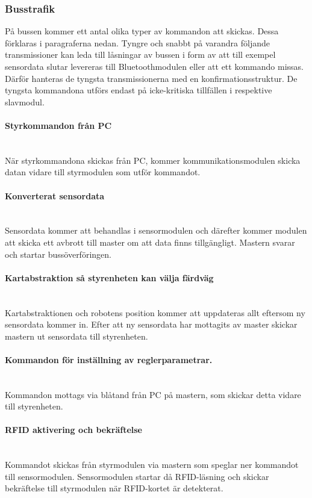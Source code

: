 \documentclass[a4paper,12pt,fleqn]{article}
\begin{document}
\subsubsection{Busstrafik}
På bussen kommer ett antal olika typer av kommandon att skickas. Dessa förklaras i paragraferna nedan. 
Tyngre och snabbt på varandra följande transmissioner kan leda till låsningar av bussen i form av att till exempel sensordata slutar levereras till Bluetoothmodulen eller att ett kommando missas. Därför hanteras de tyngsta transmissionerna med en konfirmationsstruktur.
De tyngsta kommandona utförs endast på icke-kritiska tillfällen i respektive slavmodul.

\paragraph{Styrkommandon från PC}
~\\
När styrkommandona skickas från PC, kommer kommunikationsmodulen skicka datan vidare till styrmodulen som utför kommandot.
\paragraph{Konverterat sensordata}
~\\
Sensordata kommer att behandlas i sensormodulen och därefter kommer modulen att skicka ett avbrott till master om att data finns tillgängligt. Mastern svarar och startar bussöverföringen.
\paragraph{Kartabstraktion så styrenheten kan välja färdväg}
~\\
Kartabstraktionen och robotens position kommer att uppdateras allt eftersom ny sensordata kommer in. Efter att ny sensordata har mottagits av master skickar mastern ut sensordata till styrenheten.
\paragraph{Kommandon för inställning av reglerparametrar.}
~\\
Kommandon mottags via blåtand från PC på mastern, som skickar detta vidare till styrenheten. 
\paragraph{RFID aktivering och bekräftelse}
~\\
Kommandot skickas från styrmodulen via mastern som speglar ner kommandot till sensormodulen. Sensormodulen startar då RFID-läsning och skickar bekräftelse till styrmodulen när RFID-kortet är detekterat.  
\end{document}
